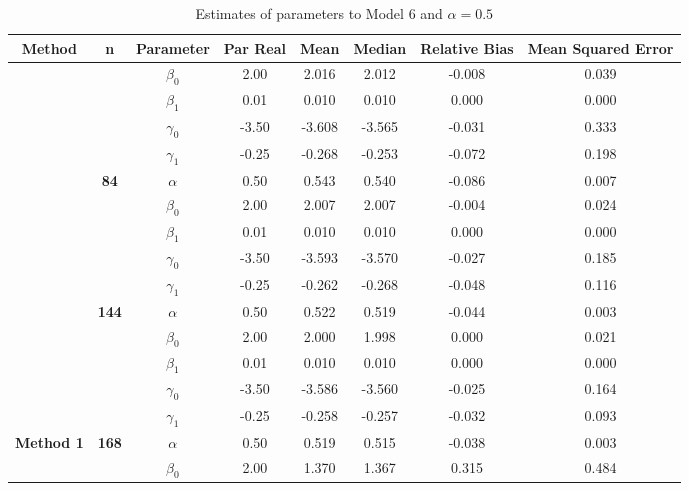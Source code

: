 \begin{table}[h]

\caption{\label{tab:Est_model_6_Alpha0.5}Estimates of parameters to Model 6 and $\alpha=0.5$}
\centering
\begin{tabular}[t]{>{}c>{}ccccccc}
\toprule
Method & n & Parameter & Par Real & Mean & Median & Relative Bias & Mean Squared Error\\
\midrule
 &  & $\beta_0$ & 2.00 & 2.016 & 2.012 & -0.008 & 0.039\\

 &  & $\beta_1$ & 0.01 & 0.010 & 0.010 & 0.000 & 0.000\\

 &  & $\gamma_0$ & -3.50 & -3.608 & -3.565 & -0.031 & 0.333\\

 &  & $\gamma_1$ & -0.25 & -0.268 & -0.253 & -0.072 & 0.198\\

 & \multirow{-5}{*}{\centering\arraybackslash \textbf{84}} & $\alpha$ & 0.50 & 0.543 & 0.540 & -0.086 & 0.007\\

 &  & $\beta_0$ & 2.00 & 2.007 & 2.007 & -0.004 & 0.024\\

 &  & $\beta_1$ & 0.01 & 0.010 & 0.010 & 0.000 & 0.000\\

 &  & $\gamma_0$ & -3.50 & -3.593 & -3.570 & -0.027 & 0.185\\

 &  & $\gamma_1$ & -0.25 & -0.262 & -0.268 & -0.048 & 0.116\\

 & \multirow{-5}{*}{\centering\arraybackslash \textbf{144}} & $\alpha$ & 0.50 & 0.522 & 0.519 & -0.044 & 0.003\\

 &  & $\beta_0$ & 2.00 & 2.000 & 1.998 & 0.000 & 0.021\\

 &  & $\beta_1$ & 0.01 & 0.010 & 0.010 & 0.000 & 0.000\\

 &  & $\gamma_0$ & -3.50 & -3.586 & -3.560 & -0.025 & 0.164\\

 &  & $\gamma_1$ & -0.25 & -0.258 & -0.257 & -0.032 & 0.093\\

\multirow{-15}{*}{\centering\arraybackslash \textbf{Method 1}} & \multirow{-5}{*}{\centering\arraybackslash \textbf{168}} & $\alpha$ & 0.50 & 0.519 & 0.515 & -0.038 & 0.003\\
\cmidrule{1-8}
 &  & $\beta_0$ & 2.00 & 1.370 & 1.367 & 0.315 & 0.484\\


\end{tabular}
\end{table}
